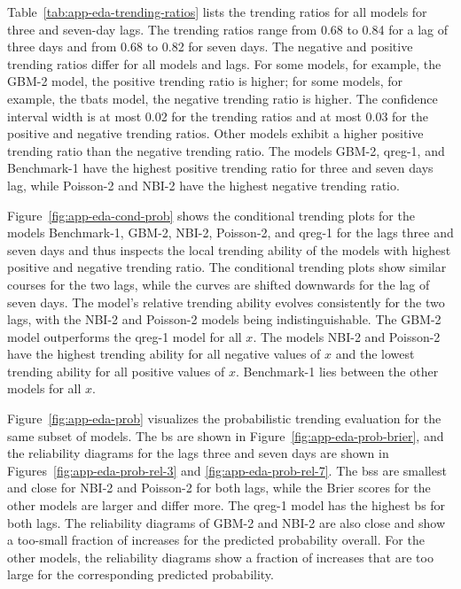 Table~\ref{tab:app-eda-trending-ratios} lists the trending ratios for all models for three and seven-day lags.
The trending ratios range from 0.68 to 0.84 for a lag of three days and from 0.68 to 0.82 for seven days.
The negative and positive trending ratios differ for all models and lags.
For some models, for example, the GBM-2 model, the positive trending ratio is higher; for some models, for example, the tbats model, the negative trending ratio is higher.
The confidence interval width is at most 0.02 for the trending ratios and at most 0.03 for the positive and negative trending ratios.
Other models exhibit a higher positive trending ratio than the negative trending ratio.
The models GBM-2, qreg-1, and Benchmark-1 have the highest positive trending ratio for three and seven days lag, while Poisson-2 and NBI-2 have the highest negative trending ratio.

Figure~\ref{fig:app-eda-cond-prob} shows the conditional trending plots for the models Benchmark-1, GBM-2, NBI-2, Poisson-2, and qreg-1 for the lags three and seven days and thus inspects the local trending ability of the models with highest positive and negative trending ratio.
The conditional trending plots show similar courses for the two lags, while the curves are shifted downwards for the lag of seven days.
The model's relative trending ability evolves consistently for the two lags, with the NBI-2 and Poisson-2 models being indistinguishable.
The GBM-2 model outperforms the qreg-1 model for all $x$.
The models NBI-2 and Poisson-2 have the highest trending ability for all negative values of $x$ and the lowest trending ability for all positive values of $x$.
Benchmark-1 lies between the other models for all $x$.

Figure~\ref{fig:app-eda-prob} visualizes the probabilistic trending evaluation for the same subset of models.
The \acf{bs} are shown in Figure~\ref{fig:app-eda-prob-brier}, and the reliability diagrams for the lags three and seven days are shown in Figures~\ref{fig:app-eda-prob-rel-3} and \ref{fig:app-eda-prob-rel-7}.
The \acp{bs} are smallest and close for NBI-2 and Poisson-2 for both lags, while the Brier scores for the other models are larger and differ more.
The qreg-1 model has the highest \ac{bs} for both lags.
The reliability diagrams of GBM-2 and NBI-2 are also close and show a too-small fraction of increases for the predicted probability overall.
For the other models, the reliability diagrams show a fraction of increases that are too large for the corresponding predicted probability.

